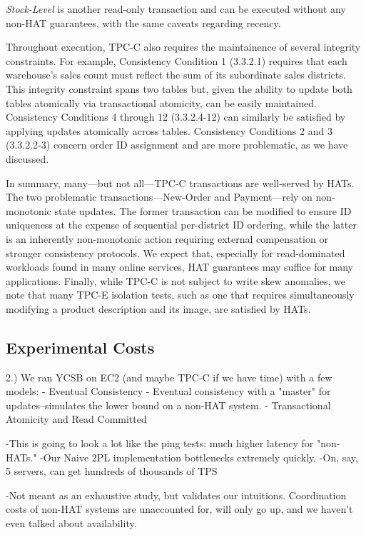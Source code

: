 \vspace{.5em}\noindent\textit{Stock-Level} is another read-only
transaction and can be executed without any non-HAT guarantees, with
the same caveats regarding recency.

\vspace{.5em} Throughout execution, TPC-C also requires the
maintainence of several integrity constraints. For example,
Consistency Condition 1 (3.3.2.1) requires that each warehouse's sales
count must reflect the sum of its subordinate sales districts. This
integrity constraint spans two tables but, given the ability to update
both tables atomically via transactional atomicity, can be easily
maintained. Consistency Conditions 4 through 12 (3.3.2.4-12) can
similarly be satisfied by applying updates atomically across
tables. Consistency Conditions 2 and 3 (3.3.2.2-3) concern order ID
assignment and are more problematic, as we have discussed.

In summary, many---but not all---TPC-C transactions are well-served by
HATs. The two problematic transactions---New-Order and Payment---rely
on non-monotonic state updates. The former transaction can be modified
to ensure ID uniqueness at the expense of sequential per-district ID
ordering, while the latter is an inherently non-monotonic action
requiring external compensation or stronger consistency protocols. We
expect that, especially for read-dominated workloads found in many
online services, HAT guarantees may suffice for many
applications. Finally, while TPC-C is not subject to write skew
anomalies, we note that many TPC-E isolation tests, such as one that
requires simultaneously modifying a product description and its image,
are satisfied by HATs.

\subsection{Experimental Costs}


2.) We ran YCSB on EC2 (and maybe TPC-C if we have time) with a few models:
	- Eventual Consistency
	- Eventual consistency with a "master" for updates--simulates the lower bound on a non-HAT system.
	- Transactional Atomicity and Read Committed
	
	-This is going to look a lot like the ping tests: much higher latency for "non-HATs."
	-Our Naive 2PL implementation bottlenecks extremely quickly.
	-On, say, 5 servers, can get hundreds of thousands of TPS

	-Not meant as an exhaustive study, but validates our intuitions. Coordination costs of non-HAT systems are unaccounted for, will only go up, and we haven't even talked about availability.

